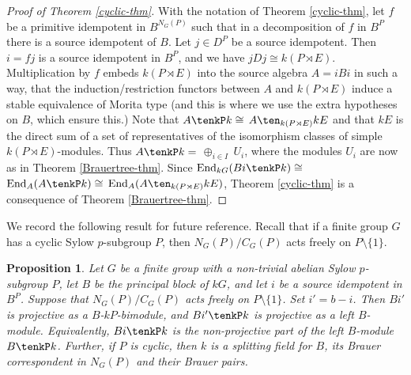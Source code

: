 \documentclass{amsart}
\theoremstyle{plain}\newtheorem{Theorem}{Theorem}[section]
\theoremstyle{plain}\newtheorem{Conjecture}[Theorem]{Conjecture}
\theoremstyle{plain}\newtheorem{Corollary}[Theorem]{Corollary}
\theoremstyle{plain}\newtheorem{Lemma}[Theorem]{Lemma}
\theoremstyle{plain}\newtheorem{Proposition}[Theorem]{Proposition}
\theoremstyle{definition}\newtheorem{Definition}[Theorem]{Definition}
\theoremstyle{definition}\newtheorem{Example}[Theorem]{Example}
\theoremstyle{definition}\newtheorem{Examples}[Theorem]{Examples}
\theoremstyle{definition}\newtheorem{Exercise}[Theorem]{Exercise}
\theoremstyle{definition}\newtheorem{Notation}[Theorem]{Notation}
\theoremstyle{definition}\newtheorem{Remark}[Theorem]{Remark}
\theoremstyle{definition}\newtheorem{Remarks}[Theorem]{Remarks}
\theoremstyle{plain}\newtheorem{Statement}[Theorem]{}
\def\End{\mathrm{End}}
\begin{document}
 
 \begin{proof}[{Proof of Theorem \ref{cyclic-thm}}]
 With the notation of Theorem \ref{cyclic-thm}, 
 let $f$ be a primitive idempotent in $B^{N_G(P)}$ such that in a decomposition
 of $f$ in $B^P$ there is a source idempotent of $B$. Let $j\in D^P$ be a source
 idempotent. Then $i=fj$ is a source idempotent in $B^P$, and we have
 $jDj\cong k(P\rtimes E)$. Multiplication by $f$ embeds $k(P\rtimes E)$ into
 the source algebra $A=iBi$ in such a way, that the induction/restriction functors
 between $A$ and $k(P\rtimes E)$ induce a stable equivalence of Morita type
 (and this is where we use the extra hypotheses on $B$, which ensure this.)
 Note that $A\tenkP k\cong$ $A\ten_{k(P\rtimes E)} kE$ and that $kE$ is the
 direct sum of a set of representatives of the isomorphism classes of simple
 $k(P\rtimes E)$-modules. Thus $A\tenkP k=$  $\oplus_{i\in I}\ U_i$, where
 the modules $U_i$ are now as in Theorem \ref{Brauertree-thm}.
 Since $\End_{kG}(B i \tenkP k)\cong$ $\End_A(A\tenkP k)\cong$ 
 $\End_A(A\ten_{k(P\rtimes E)} kE)$, Theorem \ref{cyclic-thm} is a 
 consequence of Theorem \ref{Brauertree-thm}.
 \end{proof}
  
  We record  the  following result for future reference.  
  Recall that if a finite group $G$   has  a cyclic Sylow $p$-subgroup $P$, then 
  $N_G(P)/C_G(P)$ acts freely on $P\setminus \{1\}$.
  
 \begin{Proposition} \label{proj-free-Frob-Prop}
 Let $G$ be a finite group with a non-trivial abelian Sylow $p$-subgroup $P$, let
 $B$ be the principal block of $kG$, and let $i$ be a source idempotent in $B^P$.
 Suppose that $N_G(P)/C_G(P)$ acts freely on $P\setminus \{1\}$.
 Set $i' = b-i$. Then $Bi'$ is projective as a $B$-$kP$-bimodule, and $Bi'\tenkP k$
 is projective as a left $B$-module. Equivalently, $Bi\tenkP k$ is the non-projective
 part  of the left $B$-module $B\tenkP k$.   Further,  if  $P$  is  cyclic, then  $k$ is  a 
 splitting field  for  $B$, its  Brauer correspondent in $N_G(P)$ and  their Brauer pairs.
 \end{Proposition}
 
\end{document}

